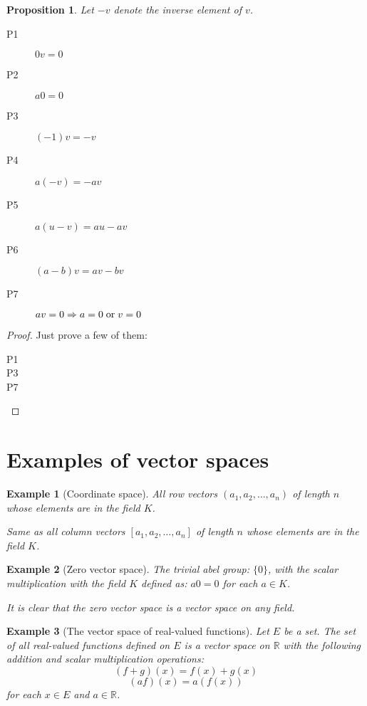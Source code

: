 \documentclass[onecolumn]{ctexart}
\newcommand*\textinmath[1]{\thickspace\textnormal{#1}\thickspace}
\newtheorem{proposition}{Proposition}
\newtheorem{example}{Example}
\begin{document}
\begin{proposition}
  Let $-v$ denote the inverse element of $v$.
  \begin{description}
    \item[P1] $0v = 0$
    \item[P2] $a0 = 0$
    \item[P3] $(-1)v = -v$
    \item[P4] $a(-v) = -av$
    \item[P5] $a(u - v) = au - av$
    \item[P6] $(a - b)v = av - bv$
    \item[P7] $av = 0 \Rightarrow a = 0 \textinmath{or} v = 0$ 
  \end{description}
\end{proposition}
\begin{proof}
  Just prove a few of them:
  \begin{description}
    \item[P1] 
    \item[P3] 
    \item[P7] 
  \end{description}
\end{proof}

\section{Examples of vector spaces}

\begin{example}[Coordinate space]
  All row vectors $(a_1, a_2, \ldots, a_n)$ of length $n$ whose elements are in the field $K$.

  Same as all column vectors $[a_1, a_2, \ldots, a_n]$ of length $n$ whose elements 
  are in the field $K$.
\end{example}

\begin{example}[Zero vector space]
  The trivial abel group: $\lbrace 0 \rbrace$, with the scalar multiplication 
  with the field $K$ defined as: $a0 = 0$ for each $a \in K$.

  It is clear that the zero vector space is a vector space on any field.
\end{example}

\begin{example}[The vector space of real-valued functions]
  Let $E$ be a set. The set of all real-valued functions defined on $E$ is a vector 
  space on $\mathbb{R}$ with the following addition and scalar multiplication 
  operations:
  \[
    (f + g)(x) = f(x) + g(x)   
  \]
  \[
    (af)(x) = a(f(x))
  \]
  for each $x \in E$ and $a \in \mathbb{R}$.
\end{example}
\end{document}
